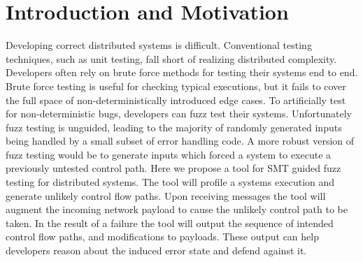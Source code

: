 \section{Introduction and Motivation}
\label{sec:intro}

Developing correct distributed systems is difficult. Conventional
testing techniques, such as unit testing, fall short of realizing
distributed complexity. Developers often rely on brute force methods
for testing their systems end to end. Brute force testing is useful
for checking typical executions, but it fails to cover the full space
of non-deterministically introduced edge cases. To artificially test for
non-deterministic bugs, developers can fuzz test their systems.
Unfortunately fuzz testing is unguided, leading to the majority of
randomly generated inputs being handled by a small subset of error
handling code. A more robust version of fuzz testing would be to
generate inputs which forced a system to execute a previously untested
control path. Here we propose a tool for SMT guided fuzz testing for
distributed systems. The tool will profile a systems execution and
generate unlikely control flow paths. Upon receiving messages the tool
will augment the incoming network payload to cause the unlikely
control path to be taken. In the result of a failure the tool will
output the sequence of intended control flow paths, and modifications
to payloads. These output can help developers reason about the induced
error state and defend against it.



